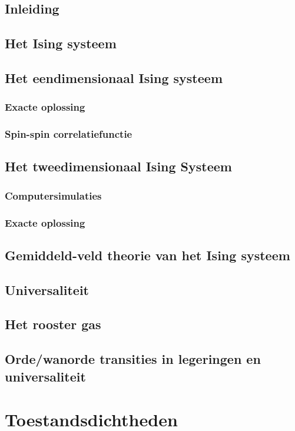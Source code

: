 \documentclass[a4paper,twoside]{article}
\theoremstyle{definition}
\theoremstyle{plain}
\begin{document}
\subsection{Inleiding}
\subsection{Het Ising systeem}
\subsection{Het eendimensionaal Ising systeem}
\subsubsection{Exacte oplossing}
\subsubsection{Spin-spin correlatiefunctie}
\subsection{Het tweedimensionaal Ising Systeem}
\subsubsection{Computersimulaties}
\subsubsection{Exacte oplossing}
\subsection{Gemiddeld-veld theorie van het Ising systeem}
\subsection{Universaliteit}
\subsection{Het rooster gas}
\subsection{Orde/wanorde transities in legeringen en universaliteit}

\appendix

\section{Toestandsdichtheden}
\end{document}
